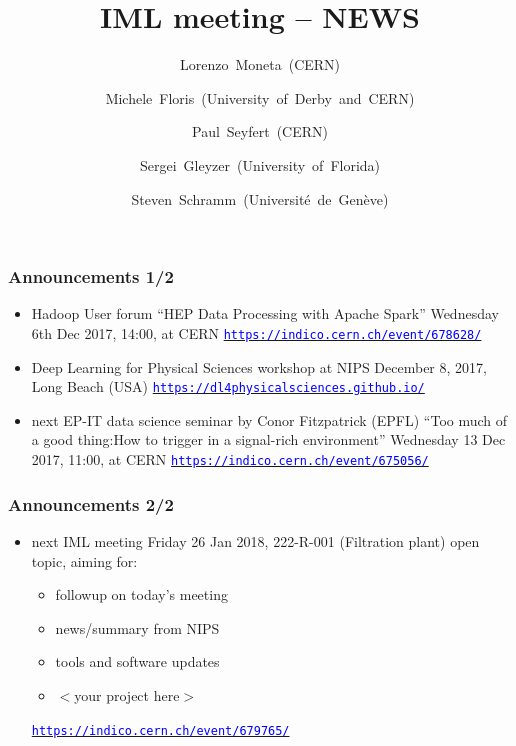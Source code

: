 \documentclass[table,xcolor=dvipsnames,professionalfonts]{beamer}
\author[~]{Lorenzo~Moneta~(CERN)\and
 Michele~Floris~(University~of~Derby~and~CERN)\and
 Paul~Seyfert~(CERN)\and
 Sergei~Gleyzer~(University~of~Florida)\and
 Steven~Schramm~(Université~de~Genève)}
\institute[CERN]{}
\date[\today]{}
\title{IML meeting -- NEWS}
\newcommand{\openref}[1]{\href{#1}{\footnotesize{\textcolor{blue}{\texttt{#1}}}}}
\begin{document}
\maketitle

\begin{frame}
  \frametitle{Announcements 1/2}

  \begin{itemize}
    \item Hadoop User forum
      \newline ``HEP Data Processing with Apache Spark''
      \newline Wednesday 6th Dec 2017, 14:00, at CERN
      \newline \openref{https://indico.cern.ch/event/678628/}
    \item Deep Learning for Physical Sciences workshop at NIPS
      \newline December 8, 2017, Long Beach (USA)
      \newline \openref{https://dl4physicalsciences.github.io/}
    \item next EP-IT data science seminar by  Conor Fitzpatrick (EPFL)
      \newline ``Too much of a good thing:\newline How to trigger in a signal-rich environment''
      \newline  Wednesday 13 Dec 2017, 11:00, at CERN
      \newline \openref{https://indico.cern.ch/event/675056/}
    \end{itemize}
  \end{frame}
  \begin{frame}
  \frametitle{Announcements 2/2}
    \begin{itemize}
    \item next IML meeting
      \newline Friday 26 Jan 2018, 222-R-001 (Filtration plant)
      \newline open topic, aiming for:
      \begin{itemize}
          \item followup on today's meeting
          \item news/summary from NIPS
          \item tools and software updates
          \item $<$your project here$>$
      \end{itemize}
      \openref{https://indico.cern.ch/event/679765/}
  \end{itemize}
\end{frame}
\end{document}

